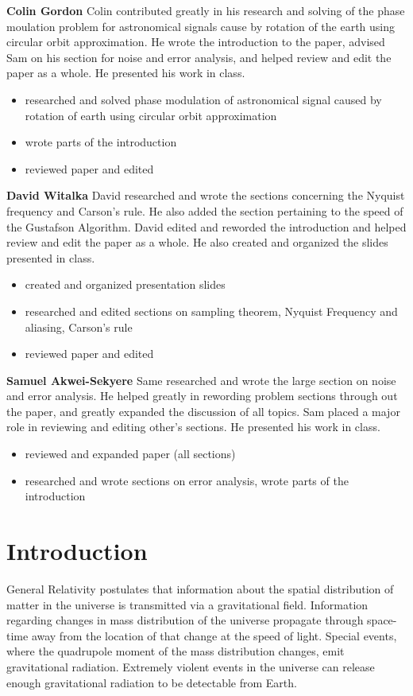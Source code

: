 \documentclass[onecolumn, groupedaddress, 10pt]{revtex4-1}
\begin{document}
\textbf{Colin Gordon}
Colin contributed greatly in his research and solving of the phase moulation problem for astronomical signals cause by rotation of the earth using circular orbit approximation. He wrote the introduction to the paper, advised Sam on his section for noise and error analysis, and helped review and edit the paper as a whole. He presented his work in class.
\begin{itemize}
\item researched and solved phase modulation of astronomical signal caused by rotation of earth using circular orbit approximation
\item wrote parts of the introduction
\item reviewed paper and edited
\end{itemize}

\textbf{David Witalka}
David researched and wrote the sections concerning the Nyquist frequency and Carson's rule. He also added the section pertaining to the speed of the Gustafson Algorithm. David edited and reworded the introduction and helped review and edit the paper as a whole. He also created and organized the slides presented in class.
\begin{itemize}
\item created and organized presentation slides
\item researched and edited sections on sampling theorem, Nyquist Frequency and aliasing, Carson’s rule
\item reviewed paper and edited
\end{itemize}

\textbf{Samuel Akwei-Sekyere}
Same researched and wrote the large section on noise and error analysis. He helped greatly in rewording problem sections through out the paper, and greatly expanded the discussion of all topics. Sam placed a major role in reviewing and editing other's sections. He presented his work in class.
\begin{itemize}
\item reviewed and expanded paper (all sections)
\item researched and wrote sections on error analysis, wrote parts of the introduction
\end{itemize}

\pagebreak


\section{Introduction}
General Relativity postulates that information about the spatial distribution of matter in the universe is transmitted via a gravitational field.  Information regarding changes in mass distribution of the universe propagate through space-time away from the location of that change at the speed of light.  Special events, where the quadrupole moment of the mass distribution changes, emit gravitational radiation.  Extremely violent events in the universe can release enough gravitational radiation to be detectable from Earth.
\end{document}
